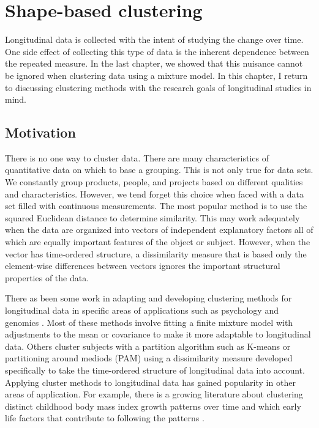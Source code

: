 \chapter{Shape-based clustering}

Longitudinal data is collected with the intent of studying the change over time. One side effect of collecting this type of data is the inherent dependence between the repeated measure. In the last chapter, we showed that this nuisance cannot be ignored when clustering data using a mixture model. In this chapter, I return to discussing clustering methods with the research goals of longitudinal studies in mind. 

\section{Motivation}
There is no one way to cluster data. There are many characteristics of quantitative data on which to base a grouping. This is not only true for data sets. We constantly group products, people, and projects based on different qualities and characteristics. However, we tend forget this choice when faced with a data set filled with continuous measurements. The most popular method is to use the squared Euclidean distance to determine similarity. This may work adequately when the data are organized into vectors of independent explanatory factors all of which are equally important features of the object or subject. However, when the vector has time-ordered structure, a dissimilarity measure that is based only the element-wise differences between vectors ignores the important structural properties of the data.  

There as been some work in adapting and developing clustering methods for longitudinal data in specific areas of applications such as psychology and genomics \cite{schneiderman1993,genolini2010, jones2001, muthen2010, mcnicholas2010}. Most of these methods involve fitting a finite mixture model with adjustments to the mean or covariance to make it more adaptable to longitudinal data. Others cluster subjects with a partition algorithm such as K-means \cite{macqueen1967,hartigan1979,} or partitioning around mediods (PAM) \cite{kaufman1990} using a dissimilarity measure developed specifically to take the time-ordered structure of longitudinal data into account. Applying cluster methods to longitudinal data has gained popularity in other areas of application. For example, there is a growing literature about clustering distinct childhood body mass index growth patterns over time and which early life factors that contribute to following the patterns \cite{pryor2011,carter2012}. 

